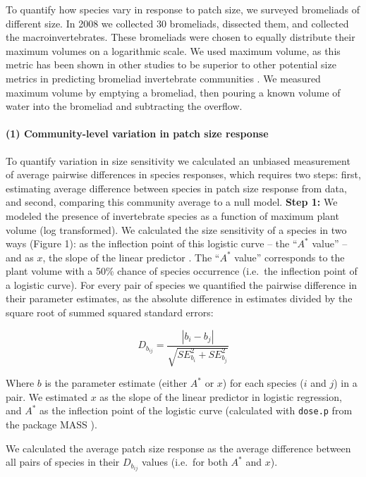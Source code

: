 To quantify how species vary in response to patch size, we surveyed
bromeliads of different size. In 2008 we collected 30 bromeliads,
dissected them, and collected the macroinvertebrates. These bromeliads
were chosen to equally distribute their maximum volumes on a logarithmic
scale. We used maximum volume, as this metric has been shown in other
studies to be superior to other potential size metrics in predicting
bromeliad invertebrate communities \citep{Srivastava2008, Marino2011}.
We measured maximum volume by emptying a bromeliad, then pouring a known
volume of water into the bromeliad and subtracting the overflow.

\paragraph{(1) Community-level variation in patch size
response}\label{community-level-variation-in-patch-size-response}

To quantify variation in size sensitivity we calculated an unbiased
measurement of average pairwise differences in species responses, which
requires two steps: first, estimating average difference between species
in patch size response from data, and second, comparing this community
average to a null model. \textbf{Step 1:} We modeled the presence of
invertebrate species as a function of maximum plant volume (log
transformed). We calculated the size sensitivity of a species in two
ways (Figure 1): as the inflection point of this logistic curve -- the
``\(A^{*}\) value'' -- and as \(x\), the slope of the linear predictor
\citep{Ovaskainen2003}. The ``\(A^{*}\) value'' corresponds to the plant
volume with a 50\% chance of species occurrence (i.e.~the inflection
point of a logistic curve). For every pair of species we quantified the
pairwise difference in their parameter estimates, as the absolute
difference in estimates divided by the square root of summed squared
standard errors:

\[D_{b_{ij}} = \frac{|b_{i} - b_{j}|}{\sqrt{SE_{b_{i}}^{2} + SE_{b_{j}}^{2}}}\]

Where \(b\) is the parameter estimate (either \(A^{*}\) or \(x\)) for
each species (\(i\) and \(j\)) in a pair. We estimated \(x\) as the
slope of the linear predictor in logistic regression, and \(A^{*}\) as
the inflection point of the logistic curve (calculated with
\texttt{dose.p} from the package MASS \citep{mass}).

We calculated the average patch size response as the average difference
between all pairs of species in their \(D_{b_{ij}}\) values (i.e.~for
both \(A^{*}\) and \(x\)).

